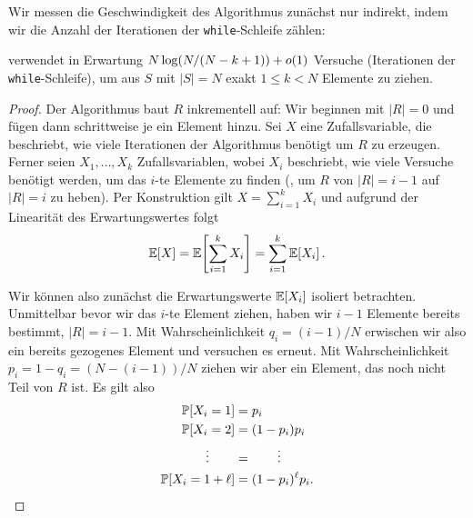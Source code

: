 \bigskip

Wir messen die Geschwindigkeit des Algorithmus zunächst nur indirekt, indem wir die Anzahl der Iterationen der \texttt{while}-Schleife zählen:

\begin{lemma}\label{lemma:basis-ziehen-ohne-zuruecklegen-versuche}
 verwendet in Erwartung $N \log(N/(N-k+1)) + {o}\!\left(1\right)$ Versuche (Iterationen der \texttt{while}-Schleife), um aus $S$ mit $|S| = N$ exakt $1 \le k < N$ Elemente zu ziehen.
\end{lemma}

\begin{proof}
    Der Algorithmus baut $R$ inkrementell auf: Wir beginnen mit $|R| = 0$ und fügen dann schrittweise je ein Element hinzu.
    Sei $X$ eine Zufallsvariable, die beschriebt, wie viele Iterationen der Algorithmus benötigt um $R$ zu erzeugen.
    Ferner seien $X_1, \ldots, X_k$ Zufallsvariablen, wobei $X_i$ beschriebt, wie viele Versuche benötigt werden, um das $i$-te Elemente zu finden (\dh, um $R$ von $|R| = i - 1$ auf  $|R| = i$ zu heben).
    Per Konstruktion gilt $X = \sum_{i=1}^k X_i$ und aufgrund der Linearität des Erwartungswertes folgt
    \begin{equation}
        \mathbb{E}\!\left[X\right] = \mathbb{E}\!\left[\sum_{i=1}^k X_i\right] = \sum_{i=1}^k \mathbb{E}\!\left[X_i\right]. \label{eq:basis-ziehen-ohne-zuruecklegen_expvX}
    \end{equation}

    Wir können also zunächst die Erwartungswerte $\mathbb{E}\!\left[X_i\right]$ isoliert betrachten.
    Unmittelbar bevor wir das $i$-te Element ziehen, haben wir $i-1$ Elemente bereits bestimmt, \dh $|R| = i - 1$.
    Mit Wahrscheinlichkeit $q_i = (i-1) / N$ erwischen wir also ein bereits gezogenes Element und versuchen es erneut.
    Mit Wahrscheinlichkeit $p_i = 1 - q_i = (N - (i - 1)) / N$ ziehen wir aber ein Element, das noch nicht Teil von $R$ ist.
    Es gilt also
    \vspace{-2ex}
    \begin{align*}
        \mathbb{P}\!\left[X_i = 1\right]            & = p_i                  \\
        \mathbb{P}\!\left[X_i = 2\right]            & = (1 -p_i) p_i         \\
        \vdots         \quad\quad & = \quad\quad \vdots    \\
        \mathbb{P}\!\left[X_i = 1 + \ell\right]     & = (1- p_i)^{\ell} p_i.
    \end{align*}


\end{proof}
